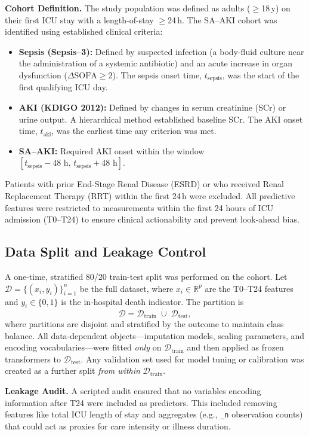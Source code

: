 \textbf{Cohort Definition.} The study population was defined as adults ($\geq$18\,y) on their first ICU stay with a length-of-stay $\geq$24\,h. The SA--AKI cohort was identified using established clinical criteria:
\begin{itemize}
    \item \textbf{Sepsis (Sepsis--3):} Defined by suspected infection (a body-fluid culture near the administration of a systemic antibiotic) and an acute increase in organ dysfunction ($\Delta\mathrm{SOFA}\geq 2$). The sepsis onset time, $t_{\text{sepsis}}$, was the start of the first qualifying ICU day.
    \item \textbf{AKI (KDIGO 2012):} Defined by changes in serum creatinine (SCr) or urine output. A hierarchical method established baseline SCr. The AKI onset time, $t_{\text{aki}}$, was the earliest time any criterion was met.
    \item \textbf{SA--AKI:} Required AKI onset within the window $[t_{\text{sepsis}}-48\text{ h},\,t_{\text{sepsis}}+48\text{ h}]$.
\end{itemize}
Patients with prior End-Stage Renal Disease (ESRD) or who received Renal Replacement Therapy (RRT) within the first 24\,h were excluded. All predictive features were restricted to measurements within the first 24 hours of ICU admission (T0--T24) to ensure clinical actionability and prevent look-ahead bias.

\subsection{Data Split and Leakage Control}
A one-time, stratified 80/20 train-test split was performed on the cohort. Let $\mathcal{D}=\{(x_i,y_i)\}_{i=1}^n$ be the full dataset, where $x_i\in\mathbb{R}^p$ are the T0--T24 features and $y_i\in\{0,1\}$ is the in-hospital death indicator. The partition is
\[
\mathcal{D} = \mathcal{D}_{\text{train}}\;\dot\cup\;\mathcal{D}_{\text{test}},
\]
where partitions are disjoint and stratified by the outcome to maintain class balance. All data-dependent objects—imputation models, scaling parameters, and encoding vocabularies—were fitted \emph{only} on $\mathcal{D}_{\text{train}}$ and then applied as frozen transformers to $\mathcal{D}_{\text{test}}$. Any validation set used for model tuning or calibration was created as a further split \emph{from within} $\mathcal{D}_{\text{train}}$.

\textbf{Leakage Audit.} A scripted audit ensured that no variables encoding information after T24 were included as predictors. This included removing features like total ICU length of stay and aggregates (e.g., \texttt{\_n} observation counts) that could act as proxies for care intensity or illness duration.

